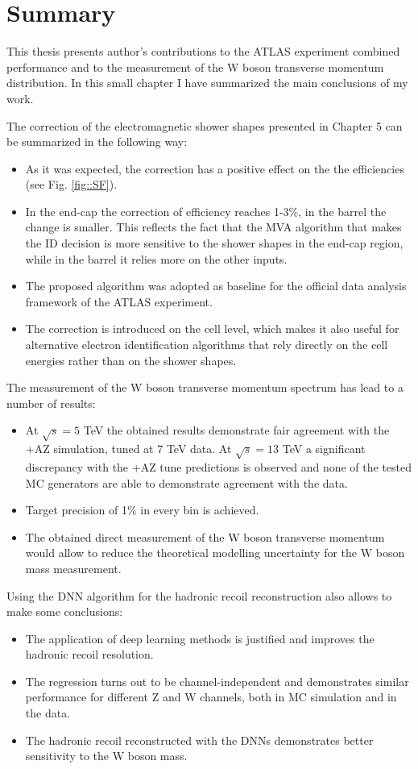 \chapter*{Summary}
This thesis presents author's contributions to the ATLAS experiment combined performance and to the measurement of the W boson transverse momentum distribution.  In this small chapter I have summarized the main conclusions of my work. 

The correction of the electromagnetic shower shapes presented in Chapter 5 can be summarized in the following way:
\begin{itemize}
	\item As it was expected, the correction has a positive effect on the the efficiencies (see Fig. \ref{fig::SF}).
	\item In the end-cap the correction of efficiency reaches 1-3\%, in the barrel the change is smaller. This reflects the fact that the MVA algorithm that makes the ID decision is more sensitive to the shower shapes in the end-cap region, while in the barrel it relies more on the other inputs. 
	\item The proposed algorithm was adopted as baseline for the official data analysis framework of the ATLAS experiment.
	\item The correction is introduced on the cell level, which makes it also useful for alternative electron identification algorithms that rely directly on the cell energies rather than on the shower shapes.
\end{itemize}
The measurement of the W boson transverse momentum spectrum has lead to a number of results:
\begin{itemize}
	\item At $\sqrt{s}=5$ TeV the obtained results demonstrate fair agreement with the \Powheg+\Pythia AZ simulation, tuned at 7 TeV data. At $\sqrt{s}=13$ TeV a significant discrepancy with the \Powheg+\Pythia AZ tune predictions is observed and none of the tested MC generators are able to demonstrate agreement with the data.
	\item Target precision of 1\% in every bin is achieved.
	\item The obtained direct measurement of the W boson transverse momentum would allow to reduce the theoretical modelling uncertainty for the W boson mass measurement.
\end{itemize}
Using the DNN algorithm for the hadronic recoil reconstruction also allows to make some conclusions:
\begin{itemize}
	\item The application of deep learning methods is justified and improves the hadronic recoil resolution.
	\item The regression turns out to be channel-independent and demonstrates similar performance for different Z and W channels, both in MC simulation and in the data.
	\item The hadronic recoil reconstructed with the DNNs demonstrates better sensitivity to the W boson mass.
\end{itemize}
